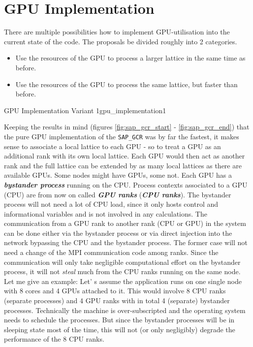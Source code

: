 \documentclass{article}
\theoremstyle{plain} %
\theoremstyle{convention} %
\theoremstyle{remark} %
\def\code#1{\texttt{#1}}
\def\df#1{\textbf{\textit{#1}}}
\numberwithin{equation}{section}
\begin{document}
\section{GPU Implementation}

There are multiple possibilities how to implement GPU-utilisation into the current state of the code. The proposals be divided roughly into 2 categories.

\begin{itemize}
    \item Use the resources of the GPU to process a larger lattice in the same time as before.
    \item Use the resources of the GPU to process the same lattice, but faster than before.
\end{itemize}

\begin{proposal}{GPU Implementation Variant 1}{gpu_implementation1} %

Keeping the results in mind (figures \ref{fig:sap_gcr_start} - \ref{fig:sap_gcr_end}) that the pure GPU implementation of the \code{SAP\_GCR} was by far the fastest, it makes sense to associate a local lattice to each GPU - so to treat a GPU as an additional rank with its own local lattice. Each GPU would then act as another rank and the full lattice can be extended by as many local lattices as there are available GPUs. Some nodes might have GPUs, some not. Each GPU has a \df{bystander process} running on the CPU. Process contexts associated to a GPU (CPU) are from now on called \df{GPU ranks} (\df{CPU ranks}). The bystander process will not need a lot of CPU load, since it only hosts control and informational variables and is not involved in any calculations. The communication from a GPU rank to another rank (CPU or GPU) in the system can be done either via the bystander process or via direct injection into the network bypassing the CPU and the bystander process. The former case will not need a change of the MPI communication code among ranks. Since the communication will only take negligible computational effort on the bystander process, it will not \textit{steal} much from the CPU ranks running on the same node. Let me give an example: Let' s assume the application runs on one single node with \num{8} cores and \num{4} GPUs attached to it. This would involve \num{8} CPU ranks (separate processes) and \num{4} GPU ranks with in total \num{4} (separate) bystander processes. Technically the machine is over-subscripted and the operating system needs to schedule the processes. But since the bystander processes will be in sleeping state most of the time, this will not (or only negligibly) degrade the performance of the \num{8} CPU ranks.


\end{proposal}
\end{document}

